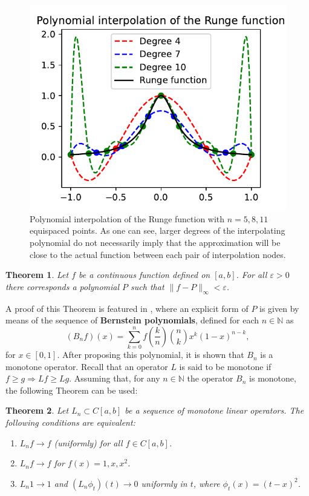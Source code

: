 \documentclass[12pt]{report} %
\newtheorem{theorem}{Theorem}
\begin{document}
\begin{figure}[ht]
  \centering
  \includegraphics[width=.55\textwidth]{imagenes/polynomial_interpolation/Runge_Polynomial_interpolation.pdf}
  \caption{Polynomial interpolation of the Runge function with $n=5,8,11$ equispaced points. As one can see, larger degrees of the interpolating polynomial do not necessarily imply that the approximation will be close to the actual function between each pair of interpolation nodes.}
  \label{fig:runge-polynomial-interpolation}
\end{figure}

\begin{theorem}
  \label{thm-polynomial-convergence}Let $f$ be a continuous function defined
  on $[a, b]$. For all $\varepsilon > 0$ there corresponds a polynomial $P$
  such that $\| f - P \|_{\infty} < \varepsilon$.
\end{theorem}

A proof of this Theorem is featured in \cite{cheney1966introduction}, where an explicit form of $P$ is given by means of the sequence of
\textbf{Bernstein polynomials}, defined for each $n \in \mathbb{N}$ as
\begin{equation}
  (B_n f) (x) = \sum_{k = 0}^n f \left( \frac{k}{n} \right) \binom{n}{k} x^k
  (1 - x)^{n - k} \label{eqn-bernstein-polynomial},
\end{equation}
for $x \in [0, 1]$. After proposing this polynomial, it is shown that $B_n$ is
a monotone operator. Recall that an operator $L$ is said to be monotone if $f
  \geq g \Rightarrow L f \geq L g$. Assuming that, for any $n\in \mathbb{N}$ the operator $B_n$ is monotone, the following Theorem can be
used:

\begin{theorem}
  \label{thm-monotone-operators}Let $L_n \subset C [a, b]$ be a sequence of
  monotone linear operators. The following conditions are equivalent:
  \begin{enumerate}
    \item $L_n f \rightarrow f$ (uniformly) for all $f \in C [a, b]$.
    \item $L_n f \rightarrow f$ for $f (x) = 1, x, x^2$.
    \item $L_n 1 \rightarrow 1$ and $(L_n \phi_t) (t) \rightarrow 0$ uniformly
          in $t$, where $\phi_t (x) = (t - x)^2$.
  \end{enumerate}

\end{theorem}
\end{document}
